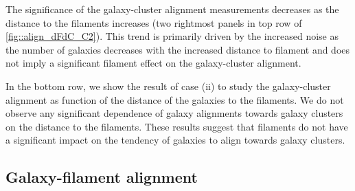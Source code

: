 \documentclass[usenatbib,useAMS]{mnras}
\theoremstyle{remark}
\newcommand{\sukhdeep}[1]{{\textcolor{magenta}{SS: #1}}}
\newcommand{\rachel}[1]{{\textcolor{cyan}{RM: #1}}}
\newcommand{\jab}[1]{{\textcolor{red}{JAB: #1}}}
\begin{document}
The significance of the galaxy-cluster alignment measurements 
decreases as the distance to the filaments increases (two rightmost panels in top row of \autoref{fig::align_dFdC_C2}).
This trend is primarily driven by the increased noise as the number of galaxies decreases with the increased distance to filament and 
does not imply a significant filament effect on the galaxy-cluster alignment.

In the bottom row, we show the result of case (ii) to study the galaxy-cluster alignment as function
of the distance of the galaxies to the filaments.
We do not observe any significant dependence of galaxy alignments towards galaxy clusters on the
distance to the filaments. 
These results suggest that filaments do not have a significant impact on the tendency of galaxies to
align towards galaxy clusters.


\subsection{Galaxy-filament alignment}
\label{sec::GF}
\end{document}
